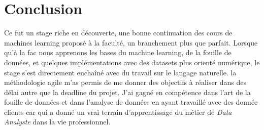 \chapter{Conclusion}

Ce fut un stage riche en découverte, une bonne continuation des cours de machines learning proposé à la faculté, un branchement plus que parfait. Lorsque qu'à la fac nous apprenons les bases du machine learning, de la fouille de données, et quelques implémentations avec des datasets plus orienté numérique, le stage s'est directement enchaîné avec du travail sur le langage naturelle.\linebreak
la méthodologie agile m'as permis de me donner des objectifs à réaliser dans des délai autre que la deadline du projet.\linebreak
J'ai gagné en compétence dans l'art de la fouille de données et dans l'analyse de données en ayant travaillé avec des donnée clients car qui a donné un vrai terrain d'apprentissage du métier de \textit{Data Analyste} dans la vie professionnel.

